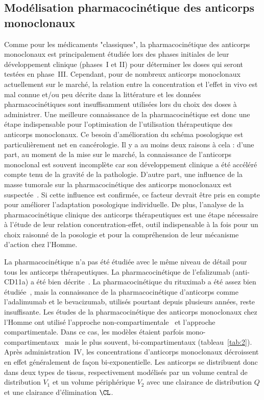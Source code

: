 \subsection{Modélisation pharmacocinétique des anticorps monoclonaux}
Comme pour les médicaments "classiques", la pharmacocinétique des anticorps monoclonaux est principalement étudiée lors des phases initiales de leur développement clinique (phases~I et II) pour déterminer les doses qui seront testées en phase~III. Cependant, pour de nombreux anticorps monoclonaux actuellement sur le marché, la relation entre la concentration et l'effet in vivo est mal connue et/ou peu décrite dans la littérature et les données pharmacocinétiques sont insuffisamment utilisées lors du choix des doses à administrer. Une meilleure connaissance de la pharmacocinétique est donc une étape indispensable pour l'optimisation de l'utilisation thérapeutique des anticorps monoclonaux. Ce besoin d'amélioration du schéma posologique est particulièrement net en cancérologie. Il y a au moins deux raisons à cela : d'une part, au moment de la mise sur le marché, la connaissance de l'anticorps monoclonal est souvent incomplète car son développement clinique a été accéléré compte tenu de la gravité de la pathologie. D'autre part, une influence de la masse tumorale sur la pharmacocinétique des anticorps monoclonaux est suspectée~\citep{REF45, REF46, REF47}. Si cette influence est confirmée, ce facteur devrait être pris en compte pour améliorer l'adaptation posologique individuelle. De plus, l'analyse de la pharmacocinétique clinique des anticorps thérapeutiques est une étape nécessaire à l'étude de leur relation concentration-effet, outil indispensable à la fois pour un choix raisonné de la posologie et pour la compréhension de leur mécanisme d'action chez l'Homme. 

La pharmacocinétique n'a pas été étudiée avec le même niveau de détail pour tous les anticorps thérapeutiques. La pharmacocinétique de l'efalizumab (anti-CD11a) a été bien décrite~\citep{REF48, REF49, REF50}. La pharmacocinétique du rituximab a été assez bien étudiée~\citep{REF51, REF52}, mais la connaissance de la pharmacocinétique d'anticorps comme l'adalimumab et le bevacizumab, utilisés pourtant depuis plusieurs années, reste insuffisante. Les études de la pharmacocinétique des anticorps monoclonaux chez l'Homme ont utilisé l'approche non-compartimentale~\citep{REF53,REF54, REF55, REF56, REF57, REF58, REF59} et l'approche compartimentale. Dans ce cas, les modèles étaient parfois mono-compartimentaux~\citep{REF60} mais le plus souvent, bi-compartimentaux (tableau~\ref{tab:2}). Après administration~\gls{IV}, les concentrations d'anticorps monoclonaux décroissent en effet généralement de façon bi-exponentielle. Les anticorps se distribuent donc dans deux types de tissus, respectivement modélisés par un volume central de distribution $V_1$ et un volume périphérique $V_2$ avec une clairance de distribution $Q$ et une clairance d'élimination $\CL$. 

